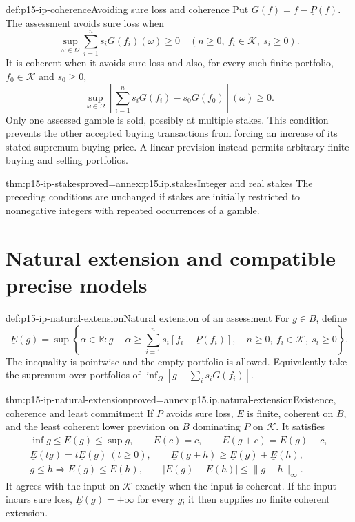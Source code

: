 \begin{hbdefinition}{def:p15-ip-coherence}{Avoiding sure loss and coherence}
Put \(G(f)=f-\underline P(f)\). The assessment avoids sure loss when
\[
 \sup_{\omega\in\Omega}\sum_{i=1}^n s_iG(f_i)(\omega)\geq0
 \quad(n\geq0,\ f_i\in\mathcal K,\ s_i\geq0).
\]
It is coherent when it avoids sure loss and also, for every such finite
portfolio, \(f_0\in\mathcal K\) and \(s_0\geq0\),
\[
 \sup_{\omega\in\Omega}
 \left[\sum_{i=1}^n s_iG(f_i)-s_0G(f_0)\right](\omega)\geq0.
\]
Only one assessed gamble is sold, possibly at multiple stakes. This
condition prevents the other accepted buying transactions from forcing
an increase of its stated supremum buying price. A linear prevision
instead permits arbitrary finite buying and selling portfolios.
\end{hbdefinition}

\begin{hblemma}{thm:p15-ip-stakes}{proved=annex:p15.ip.stakes}{Integer and real stakes}
The preceding conditions are unchanged if stakes are initially restricted
to nonnegative integers with repeated occurrences of a gamble.
\end{hblemma}

\section{Natural extension and compatible precise models}
\label{sec:p15-ip-extension}

\begin{hbdefinition}{def:p15-ip-natural-extension}{Natural extension of an assessment}
For \(g\in B\), define
\[
 \underline E(g)=\sup\left\{\alpha\in\mathbb R:
 g-\alpha\geq\sum_{i=1}^n s_i
             [f_i-\underline P(f_i)],\quad
 n\geq0,\ f_i\in\mathcal K,\ s_i\geq0\right\}.
\]
The inequality is pointwise and the empty portfolio is allowed.
Equivalently take the supremum over portfolios of
\(\inf_\Omega[g-\sum_i s_iG(f_i)]\).
\end{hbdefinition}

\begin{hbtheorem}{thm:p15-ip-natural-extension}{proved=annex:p15.ip.natural-extension}{Existence, coherence and least commitment}
If \(\underline P\) avoids sure loss, \(\underline E\) is finite,
coherent on \(B\), and the least coherent lower prevision on \(B\)
dominating \(\underline P\) on \(\mathcal K\). It satisfies
\[
\begin{gathered}
 \inf g\leq\underline E(g)\leq\sup g,\qquad
 \underline E(c)=c,\qquad
 \underline E(g+c)=\underline E(g)+c,\\
 \underline E(tg)=t\underline E(g)\ (t\geq0),\qquad
 \underline E(g+h)\geq\underline E(g)+\underline E(h),\\
 g\leq h\Longrightarrow\underline E(g)\leq\underline E(h),\qquad
 |\underline E(g)-\underline E(h)|\leq\|g-h\|_\infty.
\end{gathered}
\]
It agrees with the input on \(\mathcal K\) exactly when the input is
coherent. If the input incurs sure loss, \(\underline E(g)=+\infty\)
for every \(g\); it then supplies no finite coherent extension.
\end{hbtheorem}

